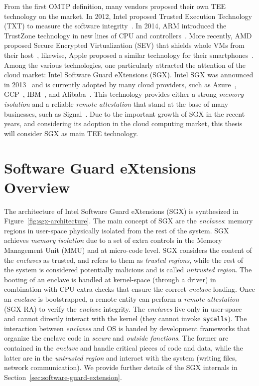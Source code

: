 From the first OMTP definition, many vendors proposed their own TEE technology 
on the market.
In 2012, Intel proposed  Trusted Execution Technology 
(TXT) to measure the software integrity~\citep{greene2012intel}.
In 2014, ARM introduced the TrustZone technology in new lines of CPU and 
controllers~\citep{arm-trustzone}. 
More recently, AMD proposed Secure Encrypted Virtualization 
(SEV) that shields whole VMs from their host~\citep{amdsev}, likewise,
Apple proposed a similar technology for their smartphones~\citep{apple-enclave}.
Among the various technologies, one particularly attracted the attention of the 
cloud market: Intel Software Guard eXtensions (SGX).
Intel SGX was announced in 2013~\citep{rozas2013intel} and is currently adopted 
by many cloud providers, such as Azure~\citep{azure}, 
GCP~\citep{challita2018precise}, IBM~\citep{IBM}, and 
Alibaba~\citep{alibabasgx}.
This technology provides either a strong \emph{memory isolation} and a reliable 
\emph{remote attestation} that stand at the base of many businesses, such as 
Signal~\citep{signal}.
Due to the important growth of SGX in the recent years, and considering its 
adoption in the cloud computing market, this thesis will consider SGX as main 
TEE technology.

\section{Software Guard eXtensions Overview}

The architecture of Intel Software Guard eXtensions (SGX) is synthesized in 
Figure~\ref{fig:sgx-architecture}.
The main concept of SGX are the \emph{enclaves}: memory regions in user-space 
physically isolated from the rest of the system.
SGX achieves \emph{memory isolation} due to a set of extra controls in the 
Memory Management Unit (MMU) and at micro-code level.
SGX considers the content of the \emph{enclaves} as trusted, and refers to them 
as \emph{trusted regions}, while the rest of the system is considered 
potentially malicious and is called \emph{untrusted region}.
The booting of an enclave is handled at kernel-space (\ie through a driver) in 
combination with CPU extra checks that ensure the correct \emph{enclave} 
loading.
Once an \emph{enclave} is bootstrapped, a remote entity can perform a 
\emph{remote attestation} (SGX RA) to verify the \emph{enclave} integrity.
The \emph{enclaves} live only in user-space and cannot directly 
interact with the kernel (\ie they cannot invoke \texttt{sycalls}).
The interaction between \emph{enclaves} and OS is handed by development 
frameworks that organize the enclave code in \emph{secure} and \emph{outside 
functions}.
The former are contained in the \emph{enclave} and handle critical pieces of 
code and data, while the latter are in the \emph{untrusted region} and interact 
with the system (\eg writing files, network communication).
We provide further details of the SGX internals in 
Section~\ref{sec:software-guard-extension}.

